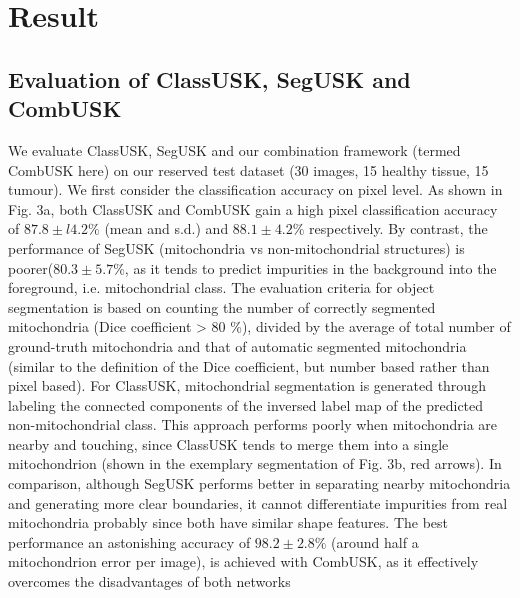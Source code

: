 \chapter{Result}\label{chapter:result}


\section{Evaluation of ClassUSK, SegUSK and CombUSK}
We evaluate ClassUSK, SegUSK and our combination framework (termed
CombUSK here) on our reserved test dataset (30 images, 15 healthy tissue, 15 tumour). We first consider the classification accuracy on pixel level. As shown in Fig.
3a, both ClassUSK and CombUSK gain a high pixel classification accuracy of
$87.8 \pm l4.2 \%$ (mean and s.d.) and $88.1 \pm 4.2 \%$ respectively. By contrast, the performance of
SegUSK (mitochondria vs non-mitochondrial structures) is poorer($80.3 \pm 5.7 \%$, as it
tends to predict impurities in the background into the foreground, i.e. mitochondrial
class. The evaluation criteria for object segmentation is based on counting the number
of correctly segmented mitochondria (Dice coefficient > 80 \%), divided by the
average of total number of ground-truth mitochondria and that of automatic
segmented mitochondria (similar to the definition of the Dice coefficient, but number
based rather than pixel based). For ClassUSK, mitochondrial segmentation is
generated through labeling the connected components of the inversed label map of
the predicted non-mitochondrial class. This approach performs poorly when
mitochondria are nearby and touching, since ClassUSK tends to merge them into a
single mitochondrion (shown in the exemplary segmentation of Fig. 3b, red arrows).
In comparison, although SegUSK performs better in separating nearby mitochondria
and generating more clear boundaries, it cannot differentiate impurities from real
mitochondria probably since both have similar shape features. The best performance
an astonishing accuracy of $98.2 \pm 2.8 \%$ (around half a mitochondrion error per image),
is achieved with CombUSK, as it effectively overcomes the disadvantages of both
networks

